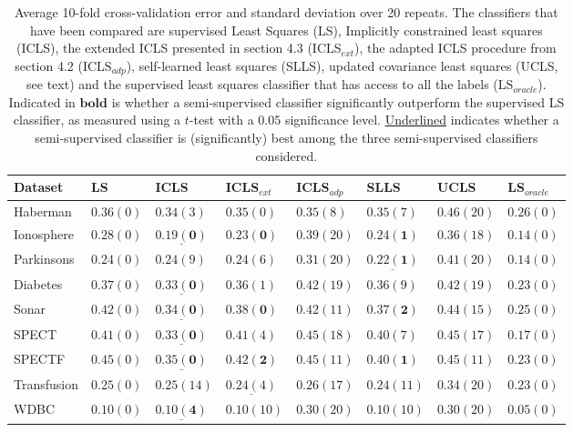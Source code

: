 \documentclass{llncs}
\begin{document}
% 

\begin{table}
\caption{Average 10-fold cross-validation error and standard deviation over 20 repeats. The classifiers that have been compared are supervised Least Squares (LS), Implicitly constrained least squares (ICLS), the extended ICLS presented in section 4.3 (ICLS$_{ext}$), the adapted ICLS procedure from section 4.2 (ICLS$_{adp}$),  self-learned least squares (SLLS), updated covariance least squares (UCLS, see text) and the supervised least squares classifier that has access to all the labels (LS$_{oracle}$). Indicated in $\mathbf{bold}$ is whether a semi-supervised classifier significantly outperform the supervised LS classifier, as measured using a $t$-test with a $0.05$ significance level. \underline{Underlined} indicates whether a semi-supervised classifier is (significantly) best among the three semi-supervised classifiers considered.} \label{table:cvresults}
\begin{tabular}{l|lllllll}
Dataset & LS & ICLS & ICLS$_{ext}$ & ICLS$_{adp}$ & SLLS & UCLS & LS$_{oracle}$ \\ 
\hline
Haberman & $0.36 (0)$& $0.34 (3)$& $0.35 (0)$& $0.35 (8)$& $0.35 (7)$& $0.46 (20)$& $0.26 (0)$\\ 
Ionosphere & $0.28 (0)$& $\mathbf{\underline{0.19 (0)}} $& $\mathbf{0.23 (0)} $& $0.39 (20)$& $\mathbf{0.24 (1)} $& $0.36 (18)$& $0.14 (0)$\\ 
Parkinsons & $0.24 (0)$& $0.24 (9)$& $0.24 (6)$& $0.31 (20)$& $\mathbf{\underline{0.22 (1)}} $& $0.41 (20)$& $0.14 (0)$\\ 
Diabetes & $0.37 (0)$& $\mathbf{\underline{0.33 (0)}} $& $0.36 (1)$& $0.42 (19)$& $0.36 (9)$& $0.42 (19)$& $0.23 (0)$\\ 
Sonar & $0.42 (0)$& $\mathbf{\underline{0.34 (0)}} $& $\mathbf{0.38 (0)} $& $0.42 (11)$& $\mathbf{0.37 (2)} $& $0.44 (15)$& $0.25 (0)$\\ 
SPECT & $0.41 (0)$& $\mathbf{\underline{0.33 (0)}} $& $0.41 (4)$& $0.45 (18)$& $0.40 (7)$& $0.45 (17)$& $0.17 (0)$\\ 
SPECTF & $0.45 (0)$& $\mathbf{\underline{0.35 (0)}} $& $\mathbf{0.42 (2)} $& $0.45 (11)$& $\mathbf{0.40 (1)} $& $0.45 (11)$& $0.23 (0)$\\ 
Transfusion & $0.25 (0)$& $0.25 (14)$& $\underline{0.24 (4)}$& $0.26 (17)$& $0.24 (11)$& $0.34 (20)$& $0.23 (0)$\\ 
WDBC & $0.10 (0)$& $\mathbf{\underline{0.10 (4)}} $& $0.10 (10)$& $0.30 (20)$& $0.10 (10)$& $0.30 (20)$& $0.05 (0)$\\ 

\end{tabular}
\end{table}
\end{document}
